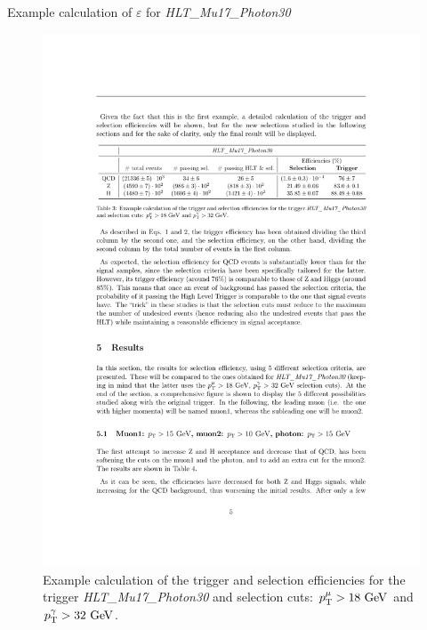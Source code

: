 \documentclass[aspectratio = 1610, xcolor = dvipsnames]{beamer}
\newcommand{\GeV}{\textrm{ }\mathrm{GeV}}
\newcommand{\pt}{p_{\rm T}}
\begin{document}
	
    \begin{frame}[t]{Example calculation of $\varepsilon$ for \textit{HLT\_Mu17\_Photon30}}
        
        \vspace{1cm}

        \begin{figure}[c]
            \centering
            \includegraphics[width=1\textwidth]{images/calcEfficiency_table.pdf}
            \caption{Example calculation of the trigger and selection efficiencies for the trigger {\it HLT\_Mu17\_Photon30} and selection cuts: $\pt^{\mu}>18\GeV$ and $\pt^{\gamma}>32\GeV$. \label{im:calcEfficiency_table}}
        \end{figure}

    \end{frame}
	
\end{document}
